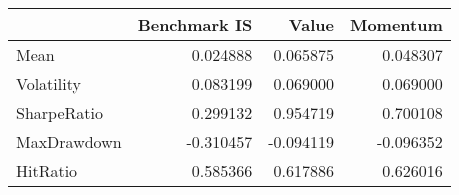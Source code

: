 \begin{tabular}{lrrr}
\toprule
{} &  Benchmark IS &     Value &  Momentum \\
\midrule
Mean        &      0.024888 &  0.065875 &  0.048307 \\
Volatility  &      0.083199 &  0.069000 &  0.069000 \\
SharpeRatio &      0.299132 &  0.954719 &  0.700108 \\
MaxDrawdown &     -0.310457 & -0.094119 & -0.096352 \\
HitRatio    &      0.585366 &  0.617886 &  0.626016 \\
\bottomrule
\end{tabular}
